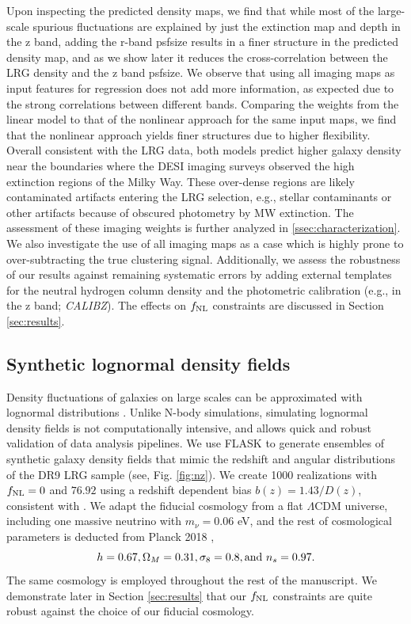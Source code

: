 Upon inspecting the predicted density maps, we find that while most of the large-scale spurious fluctuations are explained by just the extinction map and depth in the z band, adding the r-band psfsize results in a finer structure in the predicted density map, and as we show later it reduces the cross-correlation between the LRG density and the z band psfsize. We observe that using all imaging maps as input features for regression does not add more information, as expected due to the strong correlations between different bands. Comparing the weights from the linear model to that of the nonlinear approach for the same input maps, we find that the nonlinear approach yields finer structures due to higher flexibility. Overall consistent with the LRG data, both models predict higher galaxy density near the boundaries where the DESI imaging surveys observed the high extinction regions of the Milky Way. These over-dense regions are likely contaminated artifacts entering the LRG selection, e.g., stellar contaminants or other artifacts because of obscured photometry by MW extinction. The assessment of these imaging weights is further analyzed in \ref{ssec:characterization}. We also investigate the use of all imaging maps as a case which is highly prone to over-subtracting the true clustering signal. Additionally, we assess the robustness of our results against remaining systematic errors by adding external templates for the neutral hydrogen column density \citep{2016A&A...594A.116H} and the photometric calibration (e.g., in the z band; \textit{CALIBZ}). The effects on $f_{\rm NL}$ constraints are discussed in Section \ref{sec:results}.


\subsection{Synthetic lognormal density fields}\label{ssec:mocks}
Density fluctuations of galaxies on large scales can be approximated with lognormal distributions \citep{coles1991}. Unlike N-body simulations, simulating lognormal density fields is not computationally intensive, and allows quick and robust validation of data analysis pipelines. We use \textsc{FLASK} \citep[Full-sky Lognormal Astro-fields Simulation Kit;][]{Xavier_2016} to generate ensembles of synthetic galaxy density fields that mimic the redshift and angular distributions of the DR9 LRG sample (see, Fig. \ref{fig:nz}). We create 1000 realizations with $f_{\rm NL}=0$ and $76.92$ using a redshift dependent bias $b(z)=1.43/D(z)$, consistent with \cite{zhou2021clustering}. We adapt the fiducial cosmology from a flat $\Lambda$CDM universe, including one massive neutrino with $m_{\nu}=0.06$ eV, and the rest of cosmological parameters is deducted from Planck 2018 \citep{aghanim2020planck},
\begin{equation*}
 h = 0.67, \Omega_{M}=0.31, \sigma_{8}=0.8, {\rm and}~ n_{s}=0.97.
\end{equation*}
The same cosmology is employed throughout the rest of the manuscript. We demonstrate later in Section \ref{sec:results} that our $f_{\rm NL}$ constraints are quite robust against the choice of our fiducial cosmology.

